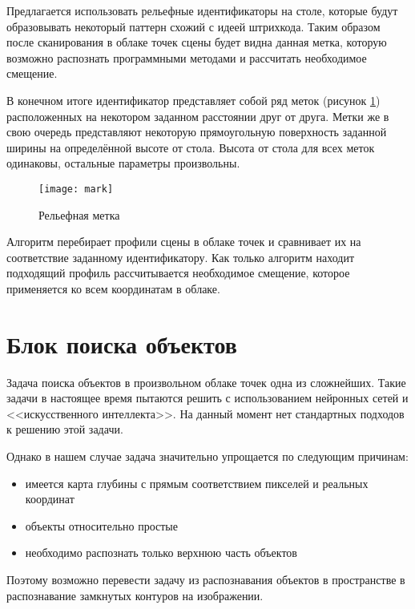             Предлагается использовать рельефные идентификаторы на столе, которые будут образовывать некоторый паттерн схожий с идеей штрихкода. Таким образом после сканирования в облаке точек сцены будет видна данная метка, которую возможно распознать программными методами и рассчитать необходимое смещение.
            
            В конечном итоге идентификатор представляет собой ряд меток (рисунок \ref{pic:mark}) расположенных на некотором заданном расстоянии друг от друга. Метки же в свою очередь представляют некоторую прямоугольную поверхность заданной ширины на определённой высоте от стола. Высота от стола для всех меток одинаковы, остальные параметры произвольны.
            
            \begin{figure}[H]
                \centering
                \texttt{[image: mark]}
                \caption{Рельефная метка}
                \label{pic:mark}
            \end{figure}
            
            Алгоритм перебирает профили сцены в облаке точек и сравнивает их на соответствие заданному идентификатору. Как только алгоритм находит подходящий профиль рассчитывается необходимое смещение, которое применяется ко всем координатам в облаке.
            
    \section{Блок поиска объектов}
        Задача поиска объектов в произвольном облаке точек одна из сложнейших. Такие задачи в настоящее время пытаются решить с использованием нейронных сетей и <<искусственного интеллекта>>. На данный момент нет стандартных подходов к решению этой задачи.
        
        Однако в нашем случае задача значительно упрощается по следующим причинам:
        \begin{itemize}
            \item имеется карта глубины с прямым соответствием пикселей и реальных координат
            \item объекты относительно простые
            \item необходимо распознать только верхнюю часть объектов
        \end{itemize}
        Поэтому возможно перевести задачу из распознавания объектов в пространстве в распознавание замкнутых контуров на изображении.
        
